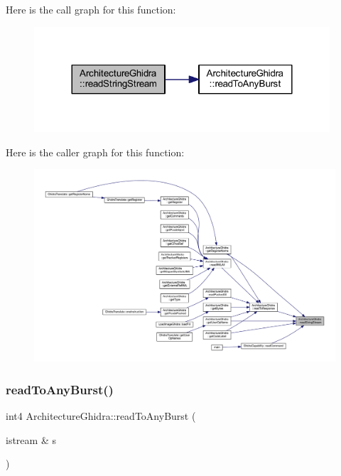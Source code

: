 Here is the call graph for this function\+:
\nopagebreak
\begin{figure}[H]
\begin{center}
\leavevmode
\includegraphics[width=312pt]{class_architecture_ghidra_a80e284d7f210bb4f528607a5a62de7ec_cgraph}
\end{center}
\end{figure}
Here is the caller graph for this function\+:
\nopagebreak
\begin{figure}[H]
\begin{center}
\leavevmode
\includegraphics[width=350pt]{class_architecture_ghidra_a80e284d7f210bb4f528607a5a62de7ec_icgraph}
\end{center}
\end{figure}
\mbox{\label{class_architecture_ghidra_a3132c5fe1bb675952197aa4eafcf298e}} 
\subsubsection{\texorpdfstring{readToAnyBurst()}{readToAnyBurst()}}
{\footnotesize\ttfamily int4 Architecture\+Ghidra\+::read\+To\+Any\+Burst (\begin{DoxyParamCaption}\item[{istream \&}]{s }\end{DoxyParamCaption})\hspace{0.3cm}{\ttfamily [static]}}



